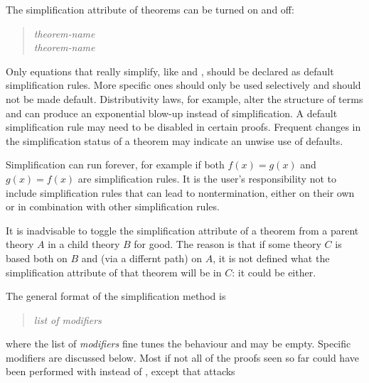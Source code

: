 \begin{isabellebody}
\begin{isamarkuptext}
The simplification attribute of theorems can be turned on and off:%
\begin{quote}
 \textit{theorem-name}\\
 \textit{theorem-name}
\end{quote}
Only equations that really simplify, like  and
, should be declared as default simplification rules. 
More specific ones should only be used selectively and should
not be made default.  Distributivity laws, for example, alter
the structure of terms and can produce an exponential blow-up instead of
simplification.  A default simplification rule may
need to be disabled in certain proofs.  Frequent changes in the simplification
status of a theorem may indicate an unwise use of defaults.
\begin{warn}
  Simplification can run forever, for example if both $f(x) = g(x)$ and
  $g(x) = f(x)$ are simplification rules. It is the user's responsibility not
  to include simplification rules that can lead to nontermination, either on
  their own or in combination with other simplification rules.
\end{warn}
\begin{warn}
  It is inadvisable to toggle the simplification attribute of a
  theorem from a parent theory $A$ in a child theory $B$ for good.
  The reason is that if some theory $C$ is based both on $B$ and (via a
  differnt path) on $A$, it is not defined what the simplification attribute
  of that theorem will be in $C$: it could be either.
\end{warn}%
\end{isamarkuptext}%
\isamarkuptrue%
%
\isamarkuptrue%
%
\begin{isamarkuptext}%
The general format of the simplification method is
\begin{quote}
\isa{simp} \textit{list of modifiers}
\end{quote}
where the list of \emph{modifiers} fine tunes the behaviour and may
be empty. Specific modifiers are discussed below.  Most if not all of the
proofs seen so far could have been performed
with \isa{simp} instead of \isa{auto}, except that \isa{simp} attacks

\end{isamarkuptext}
\end{isabellebody}

